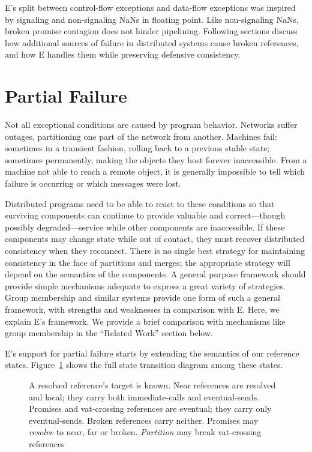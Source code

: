 \documentclass{llncs}
\begin{document}
E's split between control-flow exceptions and data-flow exceptions was
inspired by signaling and non-signaling NaNs in floating point. Like
non-signaling NaNs, broken promise contagion does not hinder
pipelining. Following sections discuss how additional sources of
failure in distributed systems cause broken references, and how E
handles them while preserving defensive consistency.

\section{Partial Failure}

Not all exceptional conditions are caused by program behavior.
Networks suffer outages, partitioning one part of the network from
another. Machines fail: sometimes in a transient fashion, rolling back
to a previous stable state; sometimes permanently, making the objects
they host forever inaccessible. From a machine not able to reach a
remote object, it is generally impossible to tell which failure is
occurring or which messages were lost.

Distributed programs need to be able to react to these conditions so
that surviving components can continue to provide valuable and
correct---though possibly degraded---service while other components are
inaccessible. If these components may change state while out of
contact, they must recover distributed consistency when they
reconnect. There is no single best strategy for maintaining
consistency in the face of partitions and merges; the 
appropriate strategy will depend on the semantics of the components. A general
purpose framework should provide simple mechanisms adequate to express
a great variety of strategies. Group membership and similar systems
provide one form of such a general framework, with strengths and
weaknesses in comparison with E. Here, we explain E's framework. We
provide a brief comparison with mechanisms like group membership in
the ``Related Work'' section below.

E's support for partial failure starts by extending the semantics of
our reference states. Figure~\ref{fig:refstates} shows the full state
transition diagram among these states.

\begin{figure}
\centerline{}
\caption{A resolved reference's target is known. Near
  references are resolved and local; they carry both immediate-calls
  and eventual-sends. Promises and vat-crossing references are
  eventual; they carry only eventual-sends. Broken references carry
  neither. Promises may \emph{resolve} to near, far or
  broken. \emph{Partition} may break vat-crossing references}
\label{fig:refstates}
\end{figure}
\end{document}
